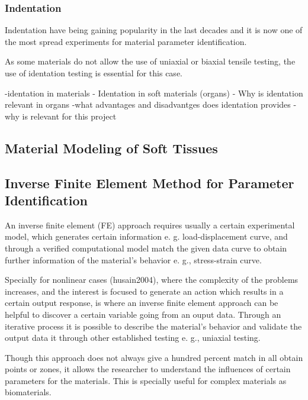 \subsubsection{Indentation}
Indentation have being gaining popularity in the last decades and it is now one of
 the most spread experiments for material parameter identification.

As some materials do not allow the use of uniaxial or biaxial tensile testing, the
 use of identation testing is essential for this case. 

-identation in materials
- Identation in soft materials (organs)
- Why is identation relevant in organs
-what advantages and disadvantges does identation provides
-why is relevant for this project 

\subsection{Material Modeling of Soft Tissues}
 


\subsection{Inverse Finite Element Method for Parameter Identification}

An inverse finite element (FE) approach requires usually a certain experimental model,
 which generates certain information e. g. load-displacement curve, and through 
a verified computational model match the given data curve to obtain further information 
of the material's behavior e. g., stress-strain curve.

Specially for nonlinear cases (husain2004), where the complexity of the problems 
increases, and the interest is focused to generate an action which results in a 
certain output response, is where an inverse finite element approach can be helpful 
to discover a certain variable going from an ouput data. Through an iterative process it is 
possible to describe the material's behavior and validate the output data it 
through other established testing e. g., uniaxial testing.

Though this approach does not always give a hundred percent match in all obtain points 
or zones, it allows the researcher to understand the influences of certain parameters 
for the materials. This is specially useful for complex materials as biomaterials. 

